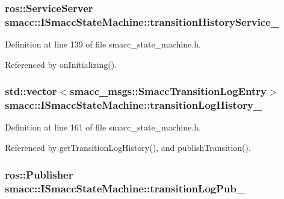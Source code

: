 \subsubsection[{\texorpdfstring{transition\+History\+Service\+\_\+}{transitionHistoryService_}}]{\setlength{\rightskip}{0pt plus 5cm}ros\+::\+Service\+Server smacc\+::\+I\+Smacc\+State\+Machine\+::transition\+History\+Service\+\_\+\hspace{0.3cm}{\ttfamily [protected]}}\hypertarget{classsmacc_1_1ISmaccStateMachine_a73e2a7ca89c3d807eafe5cfb1e86ea05}{}\label{classsmacc_1_1ISmaccStateMachine_a73e2a7ca89c3d807eafe5cfb1e86ea05}


Definition at line 139 of file smacc\+\_\+state\+\_\+machine.\+h.



Referenced by on\+Initializing().

\subsubsection[{\texorpdfstring{transition\+Log\+History\+\_\+}{transitionLogHistory_}}]{\setlength{\rightskip}{0pt plus 5cm}std\+::vector$<$smacc\+\_\+msgs\+::\+Smacc\+Transition\+Log\+Entry$>$ smacc\+::\+I\+Smacc\+State\+Machine\+::transition\+Log\+History\+\_\+\hspace{0.3cm}{\ttfamily [private]}}\hypertarget{classsmacc_1_1ISmaccStateMachine_af682d5fce5bb7c959e2b8814dae50023}{}\label{classsmacc_1_1ISmaccStateMachine_af682d5fce5bb7c959e2b8814dae50023}


Definition at line 161 of file smacc\+\_\+state\+\_\+machine.\+h.



Referenced by get\+Transition\+Log\+History(), and publish\+Transition().

\subsubsection[{\texorpdfstring{transition\+Log\+Pub\+\_\+}{transitionLogPub_}}]{\setlength{\rightskip}{0pt plus 5cm}ros\+::\+Publisher smacc\+::\+I\+Smacc\+State\+Machine\+::transition\+Log\+Pub\+\_\+\hspace{0.3cm}{\ttfamily [protected]}}\hypertarget{classsmacc_1_1ISmaccStateMachine_acc42eb050325c1edc77d81675fb1286a}{}\label{classsmacc_1_1ISmaccStateMachine_acc42eb050325c1edc77d81675fb1286a}


